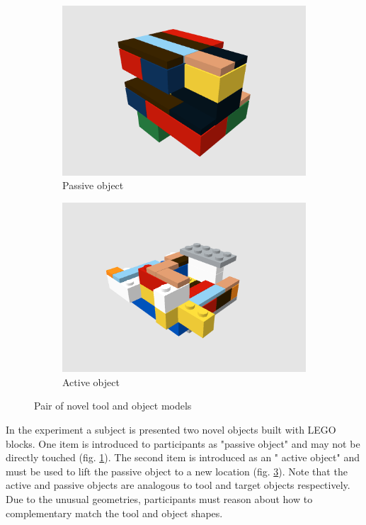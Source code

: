 \documentclass[11]{article}
\begin{document}
\begin{figure}[!h]
  \centering
  \begin{subfigure}{0.49\textwidth}
    \includegraphics[width=1\linewidth]{figures/obj51.png}
    \caption{Passive object}
    \label{fig:obj51}
  \end{subfigure}
  \begin{subfigure}{0.49\textwidth}
    \includegraphics[width=1\linewidth]{figures/obj52.png}
    \caption{Active object}
    \label{fig:obj52}
  \end{subfigure}
  \caption{Pair of novel tool and object models}
\end{figure}

In the experiment a subject is presented two novel objects built with LEGO blocks.
One item is introduced to participants as "passive object" and may not be directly touched (fig. \ref{fig:obj51}).
The second item is introduced as an " active object" and must be used to lift the passive object to a new location (fig. \ref{fig:obj52}).
Note that the active and passive objects are analogous to tool and target objects respectively.
Due to the unusual geometries, participants must reason about how to complementary match the tool and object shapes.
\end{document}
